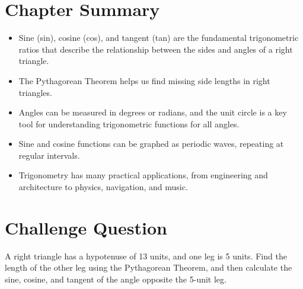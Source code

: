 \section{Chapter Summary}
\begin{itemize}
    \item Sine (sin), cosine (cos), and tangent (tan) are the fundamental trigonometric ratios that describe the relationship between the sides and angles of a right triangle.
    \item The Pythagorean Theorem helps us find missing side lengths in right triangles.
    \item Angles can be measured in degrees or radians, and the unit circle is a key tool for understanding trigonometric functions for all angles.
    \item Sine and cosine functions can be graphed as periodic waves, repeating at regular intervals.
    \item Trigonometry has many practical applications, from engineering and architecture to physics, navigation, and music.
\end{itemize}

\section{Challenge Question}
A right triangle has a hypotenuse of 13 units, and one leg is 5 units. Find the length of the other leg using the Pythagorean Theorem, and then calculate the sine, cosine, and tangent of the angle opposite the 5-unit leg.